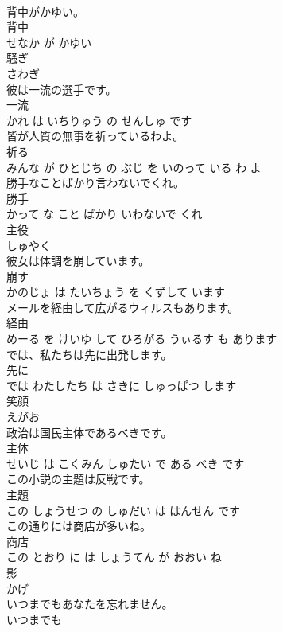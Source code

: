 \documentclass[8pt]{extreport}
\begin{document}
\begin{CJK}{UTF8}{min}
\\	背中がかゆい。	
\\	背中 
\\	せなか が かゆい			
\\	騒ぎ	
\\	さわぎ		
\\	彼は一流の選手です。	
\\	一流 
\\	かれ は いちりゅう の せんしゅ です			
\\	皆が人質の無事を祈っているわよ。	
\\	祈る 
\\	みんな が ひとじち の ぶじ を いのって いる わ よ			
\\	勝手なことばかり言わないでくれ。	
\\	勝手 
\\	かって な こと ばかり いわないで くれ			
\\	主役	
\\	しゅやく		
\\	彼女は体調を崩しています。	
\\	崩す 
\\	かのじょ は たいちょう を くずして います			
\\	メールを経由して広がるウィルスもあります。	
\\	経由 
\\	めーる を けいゆ して ひろがる うぃるす も あります			
\\	では、私たちは先に出発します。	
\\	先に 
\\	では わたしたち は さきに しゅっぱつ します			
\\	笑顔	
\\	えがお		
\\	政治は国民主体であるべきです。	
\\	主体 
\\	せいじ は こくみん しゅたい で ある べき です			
\\	この小説の主題は反戦です。	
\\	主題 
\\	この しょうせつ の しゅだい は はんせん です			
\\	この通りには商店が多いね。	
\\	商店 
\\	この とおり に は しょうてん が おおい ね			
\\	影	
\\	かげ		
\\	いつまでもあなたを忘れません。	
\\	いつまでも 

\end{CJK}
\end{document}
